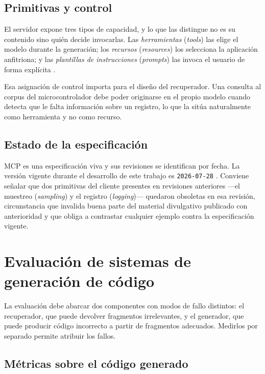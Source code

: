 \subsection{Primitivas y control}

El servidor expone tres tipos de capacidad, y lo que las distingue no es su
contenido sino quién decide invocarlas. Las \emph{herramientas}
(\emph{tools}) las elige el modelo durante la generación; los \emph{recursos}
(\emph{resources}) los selecciona la aplicación anfitriona; y las
\emph{plantillas de instrucciones} (\emph{prompts}) las invoca el usuario de
forma explícita \cite{mcp2026spec}.

Esa asignación de control importa para el diseño del recuperador. Una consulta
al corpus del microcontrolador debe poder originarse en el propio modelo cuando
detecta que le falta información sobre un registro, lo que la sitúa
naturalmente como herramienta y no como recurso.

\subsection{Estado de la especificación}

MCP es una especificación viva y sus revisiones se identifican por fecha. La
versión vigente durante el desarrollo de este trabajo es \texttt{2026-07-28}
\cite{mcp2026spec}. Conviene señalar que dos primitivas del cliente presentes en
revisiones anteriores —el muestreo (\emph{sampling}) y el registro
(\emph{logging})— quedaron obsoletas en esa revisión, circunstancia que invalida
buena parte del material divulgativo publicado con anterioridad y que obliga a
contrastar cualquier ejemplo contra la especificación vigente.

\section{Evaluación de sistemas de generación de código}

La evaluación debe abarcar dos componentes con modos de fallo distintos: el
recuperador, que puede devolver fragmentos irrelevantes, y el generador, que
puede producir código incorrecto a partir de fragmentos adecuados. Medirlos por
separado permite atribuir los fallos.

\subsection{Métricas sobre el código generado}

